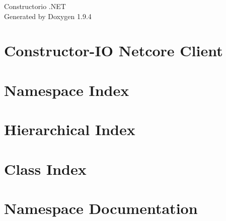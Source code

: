 \documentclass[twoside]{book}
\newcommand{\+}{\discretionary{\mbox{\scriptsize$\hookleftarrow$}}{}{}}
\newcommand{\clearemptydoublepage}{%
    \newpage{\pagestyle{empty}\cleardoublepage}%
  }
\begin{document}
  \raggedbottom
    \hypersetup{pageanchor=false,
                bookmarksnumbered=true,
                pdfencoding=unicode
               }
  \begin{titlepage}
  \vspace*{7cm}
  \begin{center}%
  {\Large Constructorio .\+NET}\\
  \vspace*{1cm}
  {\large Generated by Doxygen 1.9.4}\\
  \end{center}
  \end{titlepage}
  \clearemptydoublepage
  \tableofcontents
  \clearemptydoublepage
  \hypersetup{pageanchor=true}
\chapter{Constructor-\/\+IO Netcore Client}
\label{index}\hypertarget{index}{}
\chapter{Namespace Index}

\chapter{Hierarchical Index}

\chapter{Class Index}

\chapter{Namespace Documentation}



\end{document}

